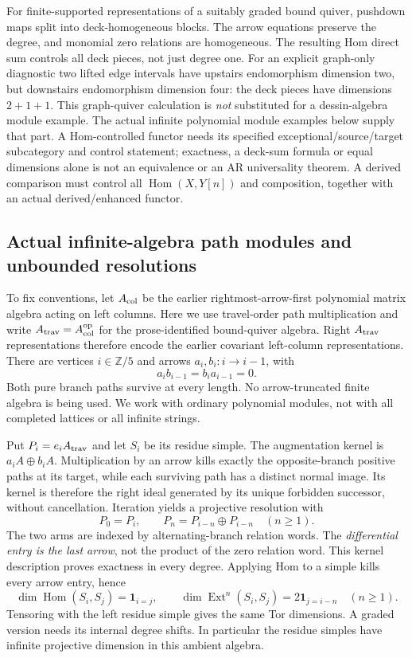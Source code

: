 \documentclass[11pt,oneside,openany]{book}
\theoremstyle{definition}\newtheorem{definition}[theorem]{Definition}
\theoremstyle{remark}\newtheorem{remark}[theorem]{Remark}
\begin{document}
For finite-supported representations of a suitably graded bound quiver,
pushdown maps split into deck-homogeneous blocks. The arrow equations
preserve the degree, and monomial zero relations are homogeneous. The
resulting Hom direct sum controls all deck pieces, not just degree one.
For an explicit graph-only diagnostic two lifted edge intervals have
upstairs endomorphism dimension two, but downstairs endomorphism dimension
four: the deck pieces have dimensions $2+1+1$. This graph-quiver calculation
is \emph{not} substituted for a dessin-algebra module example.
The actual infinite polynomial module examples below supply that part.
A Hom-controlled functor needs its specified exceptional/source/target
subcategory and control statement; exactness, a deck-sum formula or equal
dimensions alone is not an equivalence or an AR universality theorem.
A derived comparison must control all $\operatorname{Hom}(X,Y[n])$ and
composition, together with an actual derived/enhanced functor.

\subsection{Actual infinite-algebra path modules and unbounded resolutions}
To fix conventions, let $A_{\rm col}$ be the earlier rightmost-arrow-first
polynomial matrix algebra acting on left columns. Here we use travel-order
path multiplication and write $A_{\rm trav}=A_{\rm col}^{\rm op}$ for the
prose-identified bound-quiver algebra. Right $A_{\rm trav}$ representations
therefore encode the earlier covariant left-column representations.
There are vertices $i\in\mathbb Z/5$ and arrows $a_i,b_i:i\to i-1$, with
\[
 a_ib_{i-1}=b_ia_{i-1}=0.
\]
Both pure branch paths survive at every length. No arrow-truncated finite
algebra is being used. We work with ordinary polynomial modules, not with
all completed lattices or all infinite strings.

Put $P_i=e_iA_{\rm trav}$ and let $S_i$ be its residue simple.
The augmentation kernel is $a_iA\oplus b_iA$. Multiplication by an arrow
kills exactly the opposite-branch positive paths at its target, while each
surviving path has a distinct normal image. Its kernel is therefore the
right ideal generated by its unique forbidden successor, without cancellation.
Iteration yields a projective resolution with
\[
 P_0=P_i,\qquad P_n=P_{i-n}\oplus P_{i-n}\quad(n\geq1).
\]
The two arms are indexed by alternating-branch relation words. The
\emph{differential entry is the last arrow}, not the product of the zero
relation word. This kernel description proves exactness in every degree.
Applying Hom to a simple kills every arrow entry, hence
\[
 \dim\operatorname{Hom}(S_i,S_j)=\mathbf1_{i=j},\qquad
 \dim\operatorname{Ext}^n(S_i,S_j)=2\mathbf1_{j=i-n}\quad(n\geq1).
\]
Tensoring with the left residue simple gives the same Tor dimensions.
A graded version needs its internal degree shifts. In particular the
residue simples have infinite projective dimension in this ambient algebra.
\end{document}
